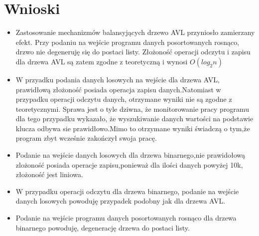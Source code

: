 \documentclass[12pt,a4paper,titlepage]{article}
\begin{document}
\section{Wnioski}
\begin{itemize}
\item Zastosowanie mechanizmów balansyjących drzewo AVL przyniosło zamierzany efekt.
Przy podaniu na wejście programu danych posortowanych rosnąco, drzwo nie degeneruję się do postaci listy.
Złożoność operacji odczytu i zapisu dla drzewa AVL są zatem zgodne z teoretyczną i wynosi $O(log_2n)$
\item W przyadku podania danych losowych na wejście dla drzewa AVL, prawidłową złożoność posiada operacja zapisu danych.Natomiast w przypadku operacji odczytu danych, otrzymane wyniki nie są zgodne z teoretycznymi.
Sprawa jest o tyle dziwna, że monitorowanie pracy programu dla tego przypadku wykazało, że wyszukiwanie danych wartości na podstawie klucza odbywa sie prawidłowo.Mimo to otrzymane wyniki świadczą o tym,że program zbyt wcześnie zakończył swoja pracę.

\item Podanie na wejście danych losowych dla drzewa binarnego,nie prawidołową zlożoność posiada operacje zapisu,ponieważ dla ilości danych powyżej 10k, złożoność jest liniowa.
\item W przypadku operacji odczytu dla drzewa binarnego, podanie na wejście danych losowych powoduję przypadek podobny jak dla drzewa AVL.
\item Podanie na wejście programu danych posortowanych rosnąco dla drzewa binarnego powoduję, degenerację drzewa do postaci listy.
\end{itemize}
\end{document}
